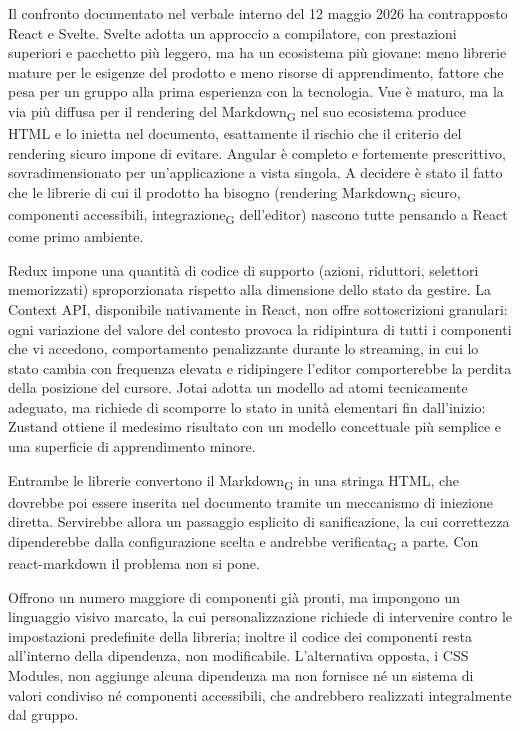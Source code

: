 \documentclass[a4paper, 10pt]{article}
\newenvironment{alternative}{%
  \begin{description}[
    style=nextline,
    leftmargin=0pt,
    labelindent=0pt,
    labelsep=0pt,
    font=\normalfont\bfseries,
    topsep=0.6em,
    itemsep=0.9em,
    parsep=0pt
  ]%
}{%
  \end{description}%
}
\newcommand{\altitem}[1]{\item[\textbullet\enspace #1]}
\begin{document}
\begin{alternative}

\altitem{Angular, Vue e Svelte al posto di React}
Il confronto documentato nel verbale interno del 12 maggio 2026 ha contrapposto React e Svelte. Svelte adotta un approccio a compilatore, con prestazioni superiori e pacchetto più leggero, ma ha un ecosistema più giovane: meno librerie mature per le esigenze del prodotto e meno risorse di apprendimento, fattore che pesa per un gruppo alla prima esperienza con la tecnologia. Vue è maturo, ma la via più diffusa per il rendering del Markdown\textsubscript{G} nel suo ecosistema produce HTML e lo inietta nel documento, esattamente il rischio che il criterio del rendering sicuro impone di evitare. Angular è completo e fortemente prescrittivo, sovradimensionato per un'applicazione a vista singola. A decidere è stato il fatto che le librerie di cui il prodotto ha bisogno (rendering Markdown\textsubscript{G} sicuro, componenti accessibili, integrazione\textsubscript{G} dell'editor) nascono tutte pensando a React come primo ambiente.

\altitem{Redux, Context API e Jotai al posto di Zustand}
Redux impone una quantità di codice di supporto (azioni, riduttori, selettori memorizzati) sproporzionata rispetto alla dimensione dello stato da gestire. La Context API, disponibile nativamente in React, non offre sottoscrizioni granulari: ogni variazione del valore del contesto provoca la ridipintura di tutti i componenti che vi accedono, comportamento penalizzante durante lo streaming, in cui lo stato cambia con frequenza elevata e ridipingere l'editor comporterebbe la perdita della posizione del cursore. Jotai adotta un modello ad atomi tecnicamente adeguato, ma richiede di scomporre lo stato in unità elementari fin dall'inizio: Zustand ottiene il medesimo risultato con un modello concettuale più semplice e una superficie di apprendimento minore.

\altitem{marked e markdown-it al posto di react-markdown}
Entrambe le librerie convertono il Markdown\textsubscript{G} in una stringa HTML, che dovrebbe poi essere inserita nel documento tramite un meccanismo di iniezione diretta. Servirebbe allora un passaggio esplicito di sanificazione, la cui correttezza dipenderebbe dalla configurazione scelta e andrebbe verificata\textsubscript{G} a parte. Con react-markdown il problema non si pone.

\altitem{MUI e Chakra UI al posto di shadcn/ui}
Offrono un numero maggiore di componenti già pronti, ma impongono un linguaggio visivo marcato, la cui personalizzazione richiede di intervenire contro le impostazioni predefinite della libreria; inoltre il codice dei componenti resta all'interno della dipendenza, non modificabile. L'alternativa opposta, i CSS Modules, non aggiunge alcuna dipendenza ma non fornisce né un sistema di valori condiviso né componenti accessibili, che andrebbero realizzati integralmente dal gruppo.


\end{alternative}
\end{document}
